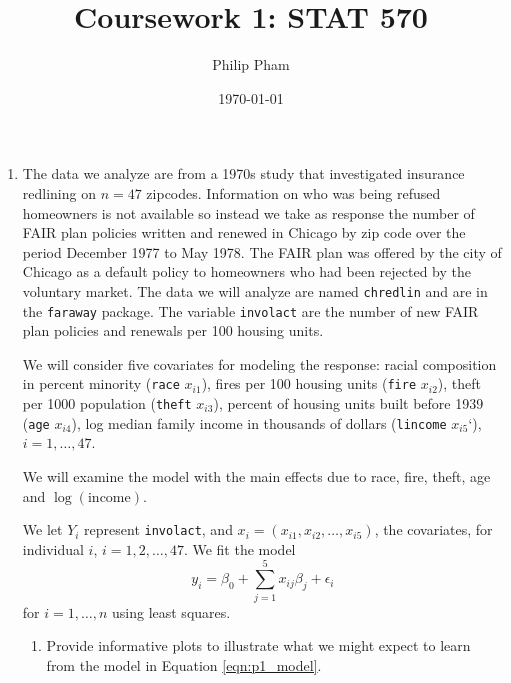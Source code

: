 \documentclass[letterpaper]{article}
\title{Coursework 1: STAT 570}
\author{Philip Pham}
\date{\today}
\begin{document}
\maketitle

\begin{enumerate}
\item The data we analyze are from a 1970s study that investigated insurance
  redlining on $n = 47$ zipcodes. Information on who was being refused
  homeowners is not available so instead we take as response the number of FAIR
  plan policies written and renewed in Chicago by zip code over the period
  December 1977 to May 1978. The FAIR plan was offered by the city of Chicago as
  a default policy to homeowners who had been rejected by the voluntary market.
  The data we will analyze are named \texttt{chredlin} and are in the
  \texttt{faraway} package. The variable \texttt{involact} are the number of new
  FAIR plan policies and renewals per 100 housing units.

  We will consider five covariates for modeling the response: racial composition
  in percent minority (\texttt{race} $x_{i1}$), fires per 100 housing units
  (\texttt{fire} $x_{i2}$), theft per 1000 population (\texttt{theft} $x_{i3}$),
  percent of housing units built before 1939 (\texttt{age} $x_{i4}$), log
  median family income in thousands of dollars (\texttt{lincome} $x_{i5}$`),
  $i = 1,\ldots,47$.

  We will examine the model with the main effects due to race, fire, theft, age
  and $\log(\mathrm{income})$.

  We let $Y_i$ represent \texttt{involact}, and
  $x_i = \left(x_{i1}, x_{i2}, \ldots, x_{i5}\right)$, the covariates, for
  individual $i$, $i = 1,2,\ldots,47$. We fit the model
  \begin{equation}
    y_i = \beta_0 + \sum_{j=1}^5x_{ij}\beta_j + \epsilon_i
    \label{eqn:p1_model}
  \end{equation}
  for $i=1,\ldots,n$ using least squares.

  \begin{enumerate}
  \item Provide informative plots to illustrate what we might expect to learn
    from the model in Equation \ref{eqn:p1_model}.
    
  \end{enumerate}  
\end{enumerate}
\end{document}
